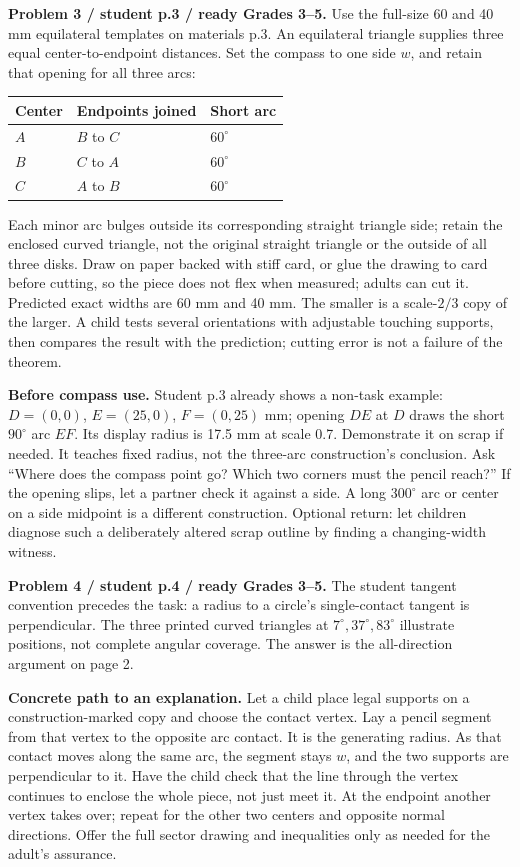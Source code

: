 \documentclass[11pt,letterpaper]{article}
\newcommand{\heading}[1]{\par\vspace{2pt}{\large\bfseries #1}\par}
\newcommand{\lead}[1]{\textbf{#1}}
\begin{document}
\newpage
\heading{Construction and explanation: Problems 3--4}
\lead{Problem 3 / student p.3 / ready Grades 3--5.} Use the full-size 60 and 40 mm equilateral templates on materials p.3. An equilateral triangle supplies three equal center-to-endpoint distances. Set the compass to one side $w$, and retain that opening for all three arcs:
\begin{center}
\begin{tabular}{lll}
\toprule Center & Endpoints joined & Short arc\\\midrule
$A$ & $B$ to $C$ & $60^\circ$\\
$B$ & $C$ to $A$ & $60^\circ$\\
$C$ & $A$ to $B$ & $60^\circ$\\\bottomrule
\end{tabular}
\end{center}
Each minor arc bulges outside its corresponding straight triangle side; retain the enclosed curved triangle, not the original straight triangle or the outside of all three disks. Draw on paper backed with stiff card, or glue the drawing to card before cutting, so the piece does not flex when measured; adults can cut it. Predicted exact widths are 60 mm and 40 mm. The smaller is a scale-$2/3$ copy of the larger. A child tests several orientations with adjustable touching supports, then compares the result with the prediction; cutting error is not a failure of the theorem.

\lead{Before compass use.} Student p.3 already shows a non-task example: $D=(0,0)$, $E=(25,0)$, $F=(0,25)$ mm; opening $DE$ at $D$ draws the short $90^\circ$ arc $EF$. Its display radius is 17.5 mm at scale 0.7. Demonstrate it on scrap if needed. It teaches fixed radius, not the three-arc construction's conclusion. Ask ``Where does the compass point go? Which two corners must the pencil reach?'' If the opening slips, let a partner check it against a side. A long $300^\circ$ arc or center on a side midpoint is a different construction. Optional return: let children diagnose such a deliberately altered scrap outline by finding a changing-width witness.

\lead{Problem 4 / student p.4 / ready Grades 3--5.} The student tangent convention precedes the task: a radius to a circle's single-contact tangent is perpendicular. The three printed curved triangles at $7^\circ,37^\circ,83^\circ$ illustrate positions, not complete angular coverage. The answer is the all-direction argument on page 2.

\lead{Concrete path to an explanation.} Let a child place legal supports on a construction-marked copy and choose the contact vertex. Lay a pencil segment from that vertex to the opposite arc contact. It is the generating radius. As that contact moves along the same arc, the segment stays $w$, and the two supports are perpendicular to it. Have the child check that the line through the vertex continues to enclose the whole piece, not just meet it. At the endpoint another vertex takes over; repeat for the other two centers and opposite normal directions. Offer the full sector drawing and inequalities only as needed for the adult's assurance.
\end{document}
